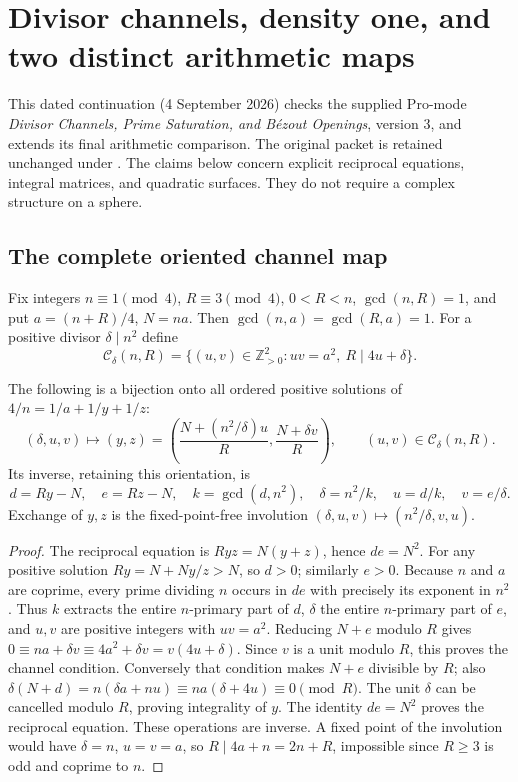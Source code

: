 \section{Divisor channels, density one, and two distinct arithmetic maps}
\label{sec:esv3-audit}

This dated continuation (4 September 2026) checks the supplied Pro-mode
\emph{Divisor Channels, Prime Saturation, and B\'ezout Openings}, version 3,
and extends its final arithmetic comparison. The original packet is retained
unchanged under .
The claims below concern explicit reciprocal equations, integral matrices,
and quadratic surfaces. They do not require a complex structure on a sphere.

\subsection{The complete oriented channel map}

Fix integers $n\equiv1\pmod4$, $R\equiv3\pmod4$, $0<R<n$,
$\gcd(n,R)=1$, and put $a=(n+R)/4$, $N=na$. Then
$\gcd(n,a)=\gcd(R,a)=1$. For a positive divisor $\delta\mid n^2$ define
\[
 \mathcal C_\delta(n,R)=\{(u,v)\in\mathbb Z_{>0}^2:
 uv=a^2,\ R\mid4u+\delta\}.
\]
\begin{proposition}\label{prop:esv3-channel}
The following is a bijection onto all ordered positive solutions of
$4/n=1/a+1/y+1/z$:
\[
 (\delta,u,v)\longmapsto
 \left(y,z\right)=
 \left(\frac{N+(n^2/\delta)u}{R},\frac{N+\delta v}{R}\right),
 \qquad (u,v)\in\mathcal C_\delta(n,R).
\]
Its inverse, retaining this orientation, is
\[
 d=Ry-N,\quad e=Rz-N,\quad k=\gcd(d,n^2),\quad
 \delta=n^2/k,\quad u=d/k,\quad v=e/\delta.
\]
Exchange of $y,z$ is the fixed-point-free involution
$(\delta,u,v)\mapsto(n^2/\delta,v,u)$.
\end{proposition}
\begin{proof}
The reciprocal equation is $Ryz=N(y+z)$, hence $de=N^2$.
For any positive solution $Ry=N+Ny/z>N$, so $d>0$; similarly $e>0$.
Because $n$ and $a$ are coprime, every prime dividing $n$ occurs in $de$
with precisely its exponent in $n^2$. Thus $k$ extracts the entire
$n$-primary part of $d$, $\delta$ the entire $n$-primary part of $e$,
and $u,v$ are positive integers with $uv=a^2$.
Reducing $N+e$ modulo $R$ gives
$0\equiv na+\delta v\equiv4a^2+\delta v=v(4u+\delta)$.
Since $v$ is a unit modulo $R$, this proves the channel condition.
Conversely that condition makes $N+e$ divisible by $R$; also
$\delta(N+d)=n(\delta a+nu)\equiv na(\delta+4u)\equiv0\pmod R$.
The unit $\delta$ can be cancelled modulo $R$, proving integrality of $y$.
The identity $de=N^2$ proves the reciprocal equation. These operations are
inverse. A fixed point of the involution would have $\delta=n$, $u=v=a$,
so $R\mid4a+n=2n+R$, impossible since $R\ge3$ is odd and coprime to $n$.
\end{proof}

